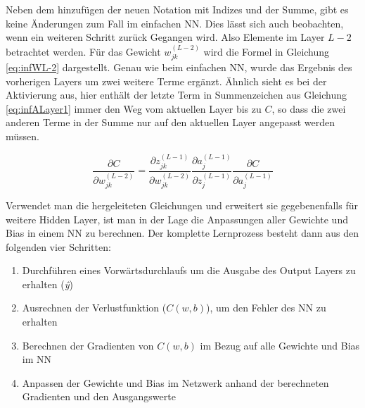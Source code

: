 Neben dem hinzufügen der neuen Notation mit Indizes und der Summe, gibt es keine Änderungen zum Fall im einfachen \ac{NN}. Dies lässt sich auch beobachten, wenn ein weiteren Schritt zurück Gegangen wird. Also Elemente im Layer $L-2$ betrachtet werden. Für das Gewicht $w_{j k}^{(L-2)}$ wird die Formel in Gleichung \ref{eq:infWL-2} dargestellt. Genau wie beim einfachen \ac{NN}, wurde das Ergebnis des vorherigen Layers um zwei weitere Terme ergänzt. Ähnlich sieht es bei der Aktivierung aus, hier enthält der letzte Term in Summenzeichen aus Gleichung \ref{eq:infALayer1} immer den Weg vom aktuellen Layer bis zu $C$, so dass die zwei anderen Terme in der Summe nur auf den aktuellen Layer angepasst werden müssen. 

\begin{equation} \label{eq:infWL-2}
    \frac{\partial C}{\partial w_{j k}^{(L-2)}}=\frac{\partial z_{j k}^{(L-1)}}{\partial w_{j k}^{(L-2)}} \frac{\partial a_{j}^{(L-1)}}{\partial z_{j}^{(L-1)}} \frac{\partial C}{\partial a_{j}^{(L-1)}}
\end{equation}

Verwendet man die hergeleiteten Gleichungen und erweitert sie gegebenenfalls für weitere Hidden Layer, ist man in der Lage die Anpassungen aller Gewichte und Bias in einem \ac{NN} zu berechnen. Der komplette Lernprozess besteht dann aus den folgenden vier Schritten:

\begin{enumerate}
    \item Durchführen eines Vorwärtsdurchlaufs um die Ausgabe des Output Layers zu erhalten (\textit{\^{y}})
    \item Ausrechnen der Verlustfunktion ($C(w,b)$), um den Fehler des \ac{NN} zu erhalten
    \item Berechnen der Gradienten von $C(w,b)$ im Bezug auf alle Gewichte und Bias im \ac{NN}
    \item Anpassen der Gewichte und Bias im Netzwerk anhand der berechneten Gradienten und den Ausgangswerte
\end{enumerate}